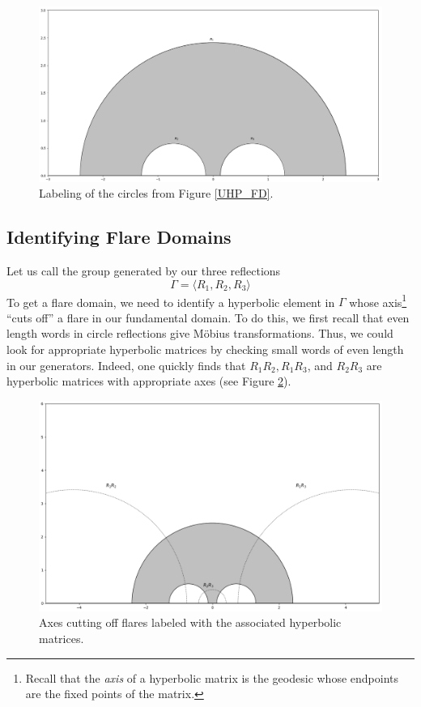 \documentclass[]{article}
\begin{document}
\begin{figure}[h]
	\centering
	\includegraphics[width=0.6\linewidth]{../UHP_labeled.png}
	\caption{Labeling of the circles from Figure \ref{UHP_FD}.}
	\label{UHP_labeled}
\end{figure}

\subsection*{Identifying Flare Domains}

Let us call the group generated by our three reflections
$$
\Gamma = \langle R_1, R_2, R_3 \rangle
$$
To get a flare domain, we need to identify a hyperbolic element in $\Gamma$ whose axis\footnote{Recall that the \textit{axis} of a hyperbolic matrix is the geodesic whose endpoints are the fixed points of the matrix.} ``cuts off'' a flare in our fundamental domain.
To do this, we first recall that even length words in circle reflections give M\"obius transformations.
Thus, we could look for appropriate hyperbolic matrices by checking small words of even length in our generators.
Indeed, one quickly finds that $R_1R_2, R_1R_3$, and $R_2R_3$ are hyperbolic matrices with appropriate axes (see Figure \ref{UHP_flares}).

\begin{figure}[h]
	\centering
	\includegraphics[width=0.6\linewidth]{../UHP_flares.png}
	\caption{Axes cutting off flares labeled with the associated hyperbolic matrices.}
	\label{UHP_flares}
\end{figure}
\end{document}

